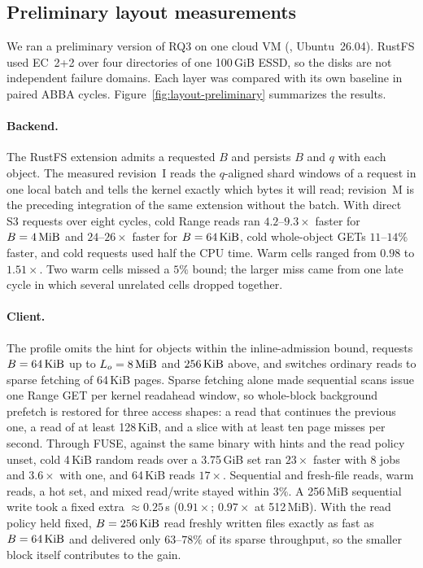 \subsection{Preliminary layout measurements}
\label{sec:layout-preliminary}

We ran a preliminary version of RQ3 on one cloud VM
(, Ubuntu~26.04). RustFS used EC~2+2 over four
directories of one 100\,GiB ESSD, so the disks are not independent failure
domains. Each layer was compared with its own baseline in paired ABBA
cycles. Figure~\ref{fig:layout-preliminary} summarizes the results.

\paragraph{Backend.} The RustFS extension admits a requested $B$ and
persists $B$ and $q$ with each object. The measured revision~I reads the
$q$-aligned shard windows of a request in one local batch and tells the
kernel exactly which bytes it will read; revision~M is the preceding
integration of the same extension without the batch. With direct S3
requests over eight cycles, cold Range reads ran $4.2$--$9.3\times$ faster
for $B=4\,\mathrm{MiB}$ and $24$--$26\times$ faster for $B=64\,\mathrm{KiB}$, cold whole-object
GETs $11$--$14\%$ faster, and cold requests used half the CPU time. Warm
cells ranged from $0.98$ to $1.51\times$. Two warm cells missed a $5\%$
bound; the larger miss came from one late cycle in which several
unrelated cells dropped together.

\paragraph{Client.} The \sys {} profile omits the hint
for objects within the inline-admission bound, requests $B=64\,\mathrm{KiB}$ up to
$L_o=8\,\mathrm{MiB}$ and $256\,\mathrm{KiB}$ above, and switches ordinary reads to sparse
fetching of 64\,KiB pages. Sparse fetching alone made sequential scans
issue one Range GET per kernel readahead window, so whole-block background
prefetch is restored for three access shapes: a read that continues the
previous one, a read of at least 128\,KiB, and a slice with at least ten
page misses per second. Through FUSE, against the same binary with hints
and the read policy unset, cold 4\,KiB random reads over a 3.75\,GiB set
ran $23\times$ faster with 8 jobs and $3.6\times$ with one, and 64\,KiB
reads $17\times$. Sequential and fresh-file reads, warm reads, a hot set,
and mixed read/write stayed within $3\%$. A 256\,MiB sequential write took
a fixed extra ${\approx}0.25$\,s ($0.91\times$; $0.97\times$ at 512\,MiB).
With the read policy held fixed, $B=256\,\mathrm{KiB}$ read freshly written files
exactly as fast as $B=64\,\mathrm{KiB}$ and delivered only $63$--$78\%$ of its sparse
throughput, so the smaller block itself contributes to the gain.

